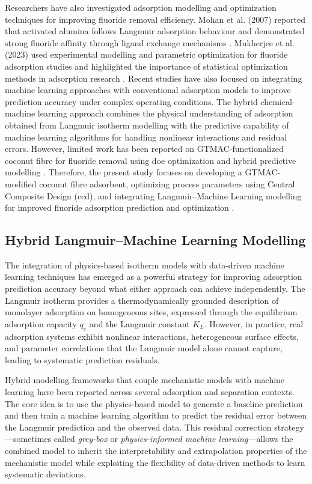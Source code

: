  Researchers have also investigated adsorption modelling and optimization techniques for 
 improving fluoride removal efficiency. Mohan et al. (2007) reported that activated alumina 
 follows Langmuir adsorption behaviour and demonstrated strong fluoride affinity through 
 ligand exchange mechanisms \cite{Mohan2007}. Mukherjee et al. (2023) used experimental 
 modelling and parametric optimization for fluoride adsorption studies and highlighted the 
 importance of statistical optimization methods in adsorption research \cite{Mukherjee2023}. 
 Recent studies have also focused on integrating machine learning approaches with conventional 
 adsorption models to improve prediction accuracy under complex operating conditions. The 
 hybrid chemical-machine learning approach combines the physical understanding of adsorption 
 obtained from Langmuir isotherm modelling with the predictive capability of machine learning 
 algorithms for handling nonlinear interactions and residual errors. However, limited work has 
 been reported on GTMAC-functionalized coconut fibre for fluoride removal using \gls{doe} 
 optimization and hybrid predictive modelling \cite{Chauhan2024}. Therefore, the present 
 study focuses on developing a GTMAC-modified coconut fibre adsorbent, optimizing process 
 parameters using Central Composite Design (\gls{ccd}), and integrating Langmuir--Machine Learning 
 modelling for improved fluoride adsorption prediction and optimization \cite{Hussain2024}.

 \subsection[Hybrid Langmuir--Machine Learning Modelling]{\textbf{Hybrid Langmuir--Machine Learning Modelling}}

 The integration of physics-based isotherm models with data-driven machine learning
 techniques has emerged as a powerful strategy for improving adsorption prediction
 accuracy beyond what either approach can achieve independently. The Langmuir isotherm
 provides a thermodynamically grounded description of monolayer adsorption on homogeneous
 sites, expressed through the equilibrium adsorption capacity $q_e$ and the Langmuir
 constant $K_L$. However, in practice, real adsorption systems exhibit nonlinear
 interactions, heterogeneous surface effects, and parameter correlations that the
 Langmuir model alone cannot capture, leading to systematic prediction residuals.

 Hybrid modelling frameworks that couple mechanistic models with machine learning have
 been reported across several adsorption and separation contexts. The core idea is to
 use the physics-based model to generate a baseline prediction and then train a
 machine learning algorithm to predict the residual error between the Langmuir
 prediction and the observed data. This residual correction strategy---sometimes
 called \emph{grey-box} or \emph{physics-informed machine learning}---allows the
 combined model to inherit the interpretability and extrapolation properties of the
 mechanistic model while exploiting the flexibility of data-driven methods to learn
 systematic deviations.

